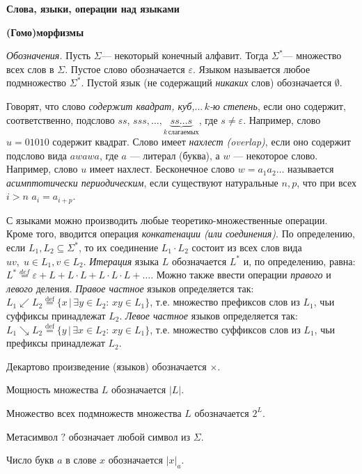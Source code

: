 \documentclass[10pt,twocolumn]{article}
\let\eps\varepsilon
\def\s{\Sigma }
\def\ss{\Sigma^* }
\begin{document}
\bigskip




\centerline{\bf Слова, языки, операции над языками} 
\centerline{\bf (Гомо)морфизмы}

\medskip

{\footnotesize
{\em Обозначения.} Пусть $\s$--- некоторый конечный алфавит. Тогда
$\ss$--- множество всех слов в $\s$. Пустое слово обозначается
$\eps$. Языком называется любое подмножество $\ss$. Пустой язык
(не содержащий {\em никаких} слов) обозначается $\emptyset$.

Говорят, что слово {\em содержит квадрат, куб,$\dots\, k$-ю степень}, если 
оно содержит, соответственно, подслово $ss$, $sss,\dots, \underbrace{ss\dots s}_{k \,\mbox{слагаемых}}$, где
$s\neq\eps$. Например, слово $u=01010$ содержит квадрат.  Слово имеет {\em нахлест (overlap)}, если оно 
содержит подслово вида $awawa$, где $a$ --- литерал (буква), а $w$ --- некоторое слово. Например, слово
$u$ имеет нахлест. Бесконечное слово $w=a_1a_2\dots$ называется {\em асимптотически периодическим}, если 
существуют натуральные $n, p$, что при всех $i>n$ $a_i=a_{i+p}$.

С языками можно производить любые теоретико-множественные операции.
Кроме того, вводится операция {\em конкатенации (или со\-е\-ди\-нения)}. По
определению, если $L_1, L_2 \subseteq \ss$, то их соединение $L_1 \cdot
L_2$ состоит из всех слов вида $uv, \; u \in L_1, v \in L_2$.
{\em Итерация} языка $L$ обозначается $L^*$ и, по определению, равна:
$L^* \stackrel{def}{=} \eps + L + L\cdot L + L\cdot L\cdot L + \dots$.
Можно также ввести операции {\em правого} и {\em левого} деления.
{\em Правое частное} языков определяется так: $L_1
\swarrow L_2 \stackrel{\mbox{def}}{=}\{x \, | \, \exists y \in L_2: \,
xy \in L_1\}$,  т.е. множество префиксов слов из $L_1$, чьи суффиксы
принадлежат $L_2$.
{\em Левое частное} языков определяется так: $L_1
\searrow L_2 \stackrel{\mbox{def}}{=}\{y \, | \, \exists x \in L_2: \,
xy \in L_1\}$,  т.е. множество суффиксов слов из $L_1$, чьи префиксы
принадлежат $L_2$.

Декартово произведение (языков) обозначается $\times$.

Мощность множества $L$ обозначается $|L|$.

Множество всех подмножеств множества $L$ обозначается
$2^L$.

Метасимвол $?$ обозначает любой символ из $\s$.

Число букв $a$ в слове $x$ обозначается $|x|_a$.

}
\end{document}
